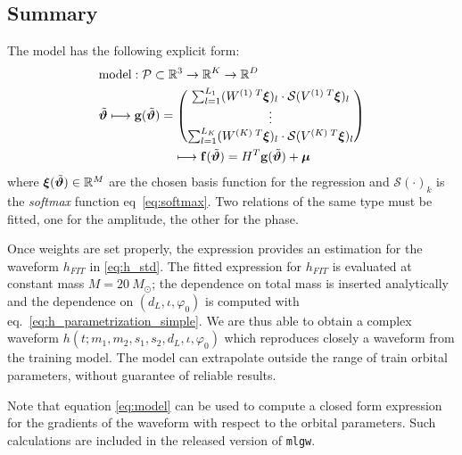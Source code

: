 \subsection{Summary}
The model has the following explicit form:
\begin{align}
	& \textrm{model}: \mathcal{P} \subset \mathbb{R}^3 \rightarrow \mathbb{R}^K \rightarrow \mathbb{R}^D \nonumber\\
	& {\tilde{\boldsymbol{\vartheta}}}
	\longmapsto  \mathbf{g}({\tilde{\boldsymbol{\vartheta}}} ) = 
		\begin{pmatrix}
		\sum_{l=1}^{L_1} (W^{(1)\;T} \boldsymbol{\xi})_l \cdot \mathcal{S}(V^{(1)\;T}\boldsymbol{\xi})_l \\
		\vdots \\
		\sum_{l=1}^{L_K}  (W^{(K)\;T} \boldsymbol{\xi})_l \cdot \mathcal{S}(V^{(K)\;T}\boldsymbol{\xi})_l
		\end{pmatrix}
	\nonumber \\	
	& \qquad \qquad \qquad \longmapsto \mathbf{f}({\tilde{\boldsymbol{\vartheta}}} ) = H^T \mathbf{g}({\tilde{\boldsymbol{\vartheta}}} ) + \boldsymbol{\mu} \label{eq:model}
\end{align}
where ${\boldsymbol{\xi}}({\tilde{\boldsymbol{\vartheta}}}) \in \mathbb{R}^M $ are the chosen basis function for the regression and $\mathcal{S}(\cdot)_k$ is the \textit{softmax} function eq~\eqref{eq:softmax}.
Two relations of the same type must be fitted, one for the amplitude, the other for the phase.
\par
Once weights are set properly, the expression provides an estimation for the waveform $h_{FIT}$ in \eqref{eq:h_std}.
The fitted expression for  $h_{FIT}$ is evaluated at constant mass $M = \SI{20}{M_\odot}$; the dependence on total mass is inserted analytically and the dependence on $(d_L, \iota, \varphi_0)$ is computed with eq.~\eqref{eq:h_parametrization_simple}.
We are thus able to obtain a complex waveform $h(t;m_1,m_2, s_1, s_2, d_L, \iota, \varphi_0)$ which reproduces closely a waveform from the training model.
The model can extrapolate outside the range of train orbital parameters, without guarantee of reliable results.
\par
Note that equation \ref{eq:model} can be used to compute a closed form expression for the gradients of the waveform with respect to the orbital parameters. Such calculations are included in the released version of \texttt{mlgw}.

